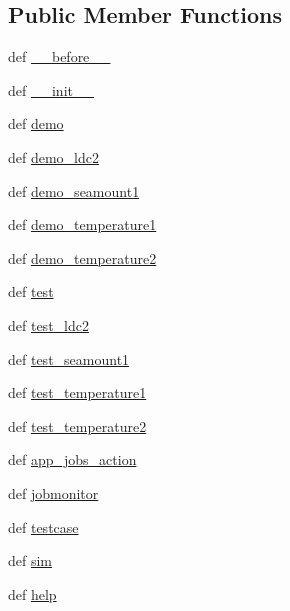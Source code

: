 \subsection*{\-Public \-Member \-Functions}
\begin{DoxyCompactItemize}
\item 
def \hyperlink{classcyberweb_1_1controllers_1_1gcom_1_1_gcom_controller_ada14d22ebfd2cc4b751f681c3e335125}{\-\_\-\-\_\-before\-\_\-\-\_\-}
\item 
def \hyperlink{classcyberweb_1_1controllers_1_1gcom_1_1_gcom_controller_a56df4b54a7acf19fcb927872b0a16f6b}{\-\_\-\-\_\-init\-\_\-\-\_\-}
\item 
def \hyperlink{classcyberweb_1_1controllers_1_1gcom_1_1_gcom_controller_a3f3888a924a6954e61bcd0f2f75cbeb9}{demo}
\item 
def \hyperlink{classcyberweb_1_1controllers_1_1gcom_1_1_gcom_controller_a33e8b64ae9ddb4779ddc75078a7f39b2}{demo\-\_\-ldc2}
\item 
def \hyperlink{classcyberweb_1_1controllers_1_1gcom_1_1_gcom_controller_a8b9aec5d0ec10baac5d38f02595bbf47}{demo\-\_\-seamount1}
\item 
def \hyperlink{classcyberweb_1_1controllers_1_1gcom_1_1_gcom_controller_a11112f144d1f22338c50fc1ea4fb63a9}{demo\-\_\-temperature1}
\item 
def \hyperlink{classcyberweb_1_1controllers_1_1gcom_1_1_gcom_controller_a8ea99f39fbe311c1952f13b6d340dd51}{demo\-\_\-temperature2}
\item 
def \hyperlink{classcyberweb_1_1controllers_1_1gcom_1_1_gcom_controller_a72e2260571e112bbf3c3da5c151a5d76}{test}
\item 
def \hyperlink{classcyberweb_1_1controllers_1_1gcom_1_1_gcom_controller_ae6939172b8425962dc8fa025f3721265}{test\-\_\-ldc2}
\item 
def \hyperlink{classcyberweb_1_1controllers_1_1gcom_1_1_gcom_controller_a546d3bf97ad0fd8e96cfaafc6deab6d1}{test\-\_\-seamount1}
\item 
def \hyperlink{classcyberweb_1_1controllers_1_1gcom_1_1_gcom_controller_a39921c6636de22d632197061be266398}{test\-\_\-temperature1}
\item 
def \hyperlink{classcyberweb_1_1controllers_1_1gcom_1_1_gcom_controller_a00fcd2eaabb611343ba222cc651aaf91}{test\-\_\-temperature2}
\item 
def \hyperlink{classcyberweb_1_1controllers_1_1gcom_1_1_gcom_controller_acaddb4db85e32493edbe77f5a84aa38f}{app\-\_\-jobs\-\_\-action}
\item 
def \hyperlink{classcyberweb_1_1controllers_1_1gcom_1_1_gcom_controller_a7e66eb7b7a3440ae7f9238bdc9646284}{jobmonitor}
\item 
def \hyperlink{classcyberweb_1_1controllers_1_1gcom_1_1_gcom_controller_a3cee70cd011f58bda53c586bac4e64c7}{testcase}
\item 
def \hyperlink{classcyberweb_1_1controllers_1_1gcom_1_1_gcom_controller_a093ca5181fb19bfba7d2bd4f0851d982}{sim}
\item 
def \hyperlink{classcyberweb_1_1controllers_1_1gcom_1_1_gcom_controller_a9d1d1f69f55a1262a9f6dba8833e42f7}{help}
\end{DoxyCompactItemize}

